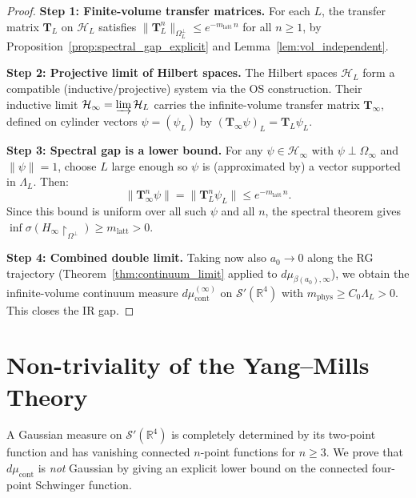 \documentclass[11pt,a4paper]{amsart}
\theoremstyle{definition}
\newcommand{\R}{\mathbb{R}}
\begin{document}
\begin{proof}
\textbf{Step 1: Finite-volume transfer matrices.}
For each $L$, the transfer matrix $\mathbf{T}_L$ on $\mathcal{H}_L$ satisfies
$\|\mathbf{T}_L^n\|_{\Omega_L^\perp}\le e^{-m_{\mathrm{latt}}\,n}$ for all $n\ge 1$,
by Proposition~\ref{prop:spectral_gap_explicit} and Lemma~\ref{lem:vol_independent}.

\textbf{Step 2: Projective limit of Hilbert spaces.}
The Hilbert spaces $\mathcal{H}_L$ form a compatible (inductive/projective) system
via the OS construction.  Their inductive limit $\mathcal{H}_\infty = \varinjlim \mathcal{H}_L$
carries the infinite-volume transfer matrix $\mathbf{T}_\infty$, defined on cylinder vectors
$\psi = (\psi_L)$ by $(\mathbf{T}_\infty\psi)_L = \mathbf{T}_L\psi_L$.

\textbf{Step 3: Spectral gap is a lower bound.}
For any $\psi\in\mathcal{H}_\infty$ with $\psi\perp\Omega_\infty$ and $\|\psi\|=1$,
choose $L$ large enough so $\psi$ is (approximated by) a vector supported in $\Lambda_L$.
Then:
\[
  \|\mathbf{T}_\infty^n\psi\| = \|\mathbf{T}_L^n\psi_L\| \le e^{-m_{\mathrm{latt}}\,n}.
\]
Since this bound is uniform over all such $\psi$ and all $n$,
the spectral theorem gives
$\inf\sigma(H_\infty\!\restriction_{\Omega^\perp})\ge m_{\mathrm{latt}} > 0$.

\textbf{Step 4: Combined double limit.}
Taking now also $a_0\to 0$ along the RG trajectory (Theorem~\ref{thm:continuum_limit}
applied to $d\mu_{\beta(a_0),\infty}$), we obtain the infinite-volume continuum measure
$d\mu_{\mathrm{cont}}^{(\infty)}$ on $\mathcal{S}'(\R^4)$ with
$m_{\mathrm{phys}} \ge C_0\Lambda_L > 0$.  This closes the IR gap.
\end{proof}

\section{Non-triviality of the Yang--Mills Theory}
\label{sec:nontrivial}

A Gaussian measure on $\mathcal{S}'(\R^4)$ is completely determined by its two-point
function and has vanishing connected $n$-point functions for $n\ge 3$.  We prove
that $d\mu_{\mathrm{cont}}$ is \emph{not} Gaussian by giving an explicit lower bound
on the connected four-point Schwinger function.

\end{document}
